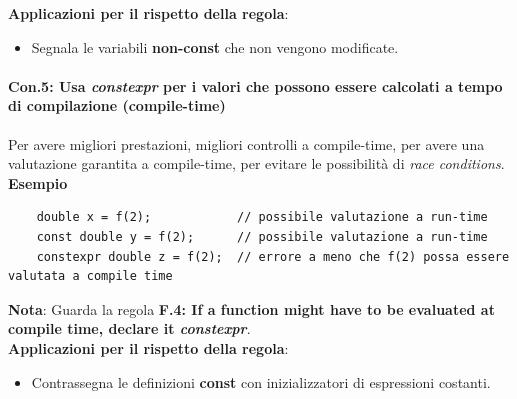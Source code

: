 \textsf{\small \textbf{Applicazioni per il rispetto della regola}: }

\begin{itemize}
	\item \textsf{\small Segnala le variabili \textbf{non-const} che non vengono modificate.}
\end{itemize}

\paragraph{Con.5: Usa \emph{constexpr} per i valori che possono essere calcolati a tempo di compilazione (compile-time)}

\textsf{\small Per avere migliori prestazioni, migliori controlli a compile-time, per avere una valutazione garantita a compile-time, per evitare le possibilità di \emph{race conditions}.} \\

\textsf{\small \textbf{Esempio}}

\begin{lstlisting}
	double x = f(2);            // possibile valutazione a run-time
	const double y = f(2);      // possibile valutazione a run-time
	constexpr double z = f(2);  // errore a meno che f(2) possa essere valutata a compile time
\end{lstlisting}

\textsf{\small \textbf{Nota}: Guarda la regola \textbf{F.4: If a function might have to be evaluated at compile time, declare it \emph{constexpr}}.} \\

\textsf{\small \textbf{Applicazioni per il rispetto della regola}: }

\begin{itemize}
	\item \textsf{\small Contrassegna le definizioni \textbf{const} con inizializzatori di espressioni costanti.} %
\end{itemize}



